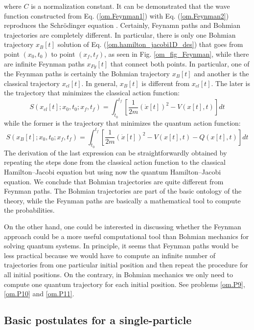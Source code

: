 \documentclass[nofootinbib, secnumarabic, amsmath, nobibnotes,11pt,aps,pra, floatfix]{revtex4-1}
\newcommand{\fref}[1]{Fig. \ref{#1}}
\newcommand{\eref}[1]{Eq. (\ref{#1})}
\begin{document}
\noindent where $C$ is a normalization constant. It can be
demonstrated that the wave function constructed from
\eref{om.Feynman1} with \eref{om.Feynman2} reproduces the
Schr\"odinger equation \cite{om.feynmann1965}. Certainly, Feynamn
paths and Bohmian trajectories are completely different. In
particular, there is only one Bohmian trajectory $x\!_{B}[t]$ solution
of \eref{om.hamilton_jacobi1D_des} that goes from point $(x_0,t_0)$
to point $(x\!_f,t\!_f)$, as seen in \fref{om_fig_Feynman}, while there
are infinite Feynman paths $x_\textit{Fy}[t]$ that connect both points. In
particular, one of the Feynman paths is certainly the Bohmian trajectory  $x\!_{B}[t]$ and
another is the classical trajectory $x_{cl}[t]$. In general,
$x\!_{B}[t]$ is different from $x_{cl}[t]$. The later is the
trajectory that minimizes the classical action function:
\begin{equation}
\label{om.action_function_clas}
 S(x_{cl}[t];x_0,t_0;x_f,t_f) = \int_{t_0}^{t_f} \left[ \frac {1} {2m} (\dot{x}[t])^2 -V(x[t],t) \right] dt
\end{equation}
while the former is the trajectory that minimizes the quantum action function:
\begin{equation}
\label{om.action_function_quan}
 S(x_{B}[t];x_0,t_0;x_f,t_f) =\! \int_{t_0}^{t_f} \left[ \frac {1} {2m} (\dot{x}[t])^2 -V(x[t],t) -Q(x[t],t) \right] dt
\end{equation}
The derivation of the last expression can be straightforwardly obtained by repeating the steps done from the classical action function to the classical Hamilton--Jacobi equation but using now the quantum Hamilton--Jacobi equation. We conclude that Bohmian trajectories are quite different from Feynman paths. The Bohmian trajectories are part of the basic ontology of the theory, while the Feynman paths are basically a mathematical tool to compute the probabilities.  


On the other hand, one could be interested in discussing whether the Feynman approach could be a more useful computational tool than Bohmian mechanics for solving quantum systems. In principle, it seems that Feynman paths would be less practical because we would have to compute an infinite number of trajectories from one particular initial position and then repeat the procedure for all initial positions. On the contrary, in Bohmian mechanics we only need to compute one quantum trajectory for each initial position. See problems \ref{om.P9}, \ref{om.P10} and \ref{om.P11}.  


\subsection{Basic postulates  for a single-particle}\label{om.sec_single.6}
\end{document}
